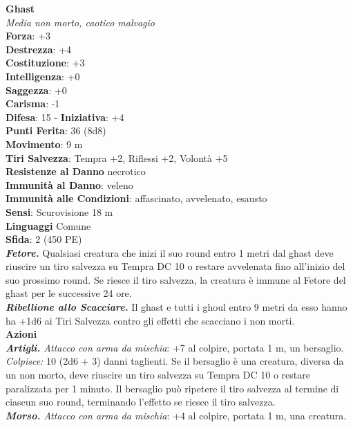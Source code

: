 \begin{multicols}{2}
\medskip\textbf{Ghast}\\
\emph{Media non morto, caotico malvagio}\\
\textbf{Forza}: +3\\
\textbf{Destrezza}: +4\\
\textbf{Costituzione}: +3\\
\textbf{Intelligenza}: +0\\
\textbf{Saggezza}: +0\\
\textbf{Carisma}: -1\\
\textbf{Difesa}: 15 - \textbf{Iniziativa}: +4\\
\textbf{Punti Ferita}: 36 (8d8)\\
\textbf{Movimento}: 9 m\\
\textbf{Tiri Salvezza}: Tempra +2, Riflessi +2, Volontà +5\\
\textbf{Resistenze al Danno} necrotico\\
\textbf{Immunità al Danno}: veleno\\
\textbf{Immunità alle Condizioni}: affascinato, avvelenato, esausto\\
\textbf{Sensi}: Scurovisione 18 m \\
\textbf{Linguaggi} Comune\\
\textbf{Sfida}: 2 (450 PE)\smallskip\\
\emph{\textbf{Fetore.}} Qualsiasi creatura che inizi il suo round entro 1 metri dal ghast deve riuscire un tiro salvezza su Tempra DC 10 o restare avvelenata fino all'inizio del suo prossimo round. Se riesce il tiro  salvezza, la creatura è immune al Fetore del ghast per le successive 24 ore.\\
\emph{\textbf{Ribellione allo Scacciare.}} Il ghast e tutti i ghoul entro 9 metri da esso hanno ha +1d6 ai Tiri Salvezza contro gli effetti che scacciano i non morti. \\
\smallskip\textbf{Azioni}\\
\emph{\textbf{Artigli.} Attacco con arma da mischia}: +7 al colpire, portata 1 m, un bersaglio.\\
\emph{Colpisce:} 10 (2d6 + 3) danni taglienti. Se il bersaglio è una creatura, diversa da un non morto, deve riuscire un tiro salvezza su Tempra DC 10 o restare paralizzata per 1 minuto. Il bersaglio può ripetere il tiro salvezza al termine di ciascun suo round, terminando l'effetto se riesce il tiro salvezza.\\
\emph{\textbf{Morso.} Attacco con arma da mischia}: +4 al colpire, portata 1 m, una creatura.\\

\end{multicols}

